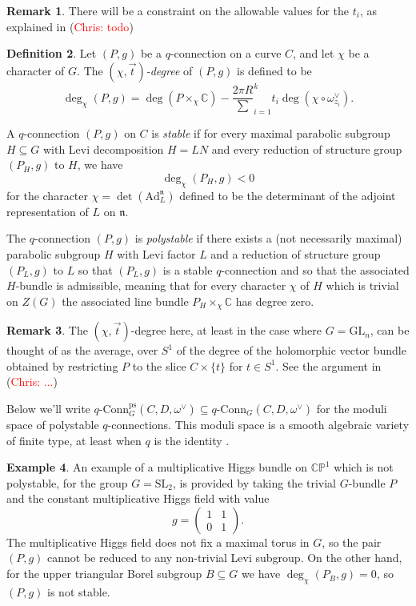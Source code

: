 \documentclass[11pt, oneside, reqno]{amsart}
\theoremstyle{definition} \newtheorem{definition}{Definition}[section]
\theoremstyle{definition} \newtheorem{remark}[definition]{Remark}
\theoremstyle{definition} \newtheorem{remarks}[definition]{Remarks}
\theoremstyle{definition} \newtheorem{question}[definition]{Question}
\theoremstyle{definition} \newtheorem*{note}{Note}
\theoremstyle{definition} \newtheorem{example}[definition]{Example}
\theoremstyle{definition} \newtheorem{examples}[definition]{Examples}
\newcommand{\bb}[1]{\mathbb{#1}}
\newcommand{\mr}[1]{\mathrm{#1}}
\newcommand{\mf}[1]{\mathfrak{#1}}
\newcommand{\CC}{\mathbb{C}}
\newcommand{\SL}{\mathrm{SL}}
\newcommand{\GL}{\mathrm{GL}}
\newcommand{\sub}{\subseteq}
\newcommand{\qconn}{q\text{-Conn}}
\newcommand{\chris}[1]{(\textcolor{red}{Chris: #1})}
\begin{document}
\begin{remark} \label{t_stability_remark}
There will be a constraint on the allowable values for the $t_i$, as explained in \chris{todo}
\end{remark}

\begin{definition} \label{polystable_def}
Let $(P,g)$ be a $q$-connection on a curve $C$, and let $\chi$ be a character of $G$.  The \emph{$(\chi, \overrightarrow{t})$-degree} of $(P,g)$ is defined to be 
\[\deg_\chi(P,g) = \deg(P \times_\chi \CC) - \frac {2\pi R} \sum_{i=1}^k t_i\deg(\chi \circ \omega^\vee_{z_i}).\]

A $q$-connection $(P,g)$ on $C$ is \emph{stable} if for every maximal parabolic subgroup $H \sub G$ with Levi decomposition $H = LN$ and every reduction of structure group $(P_H, g)$ to $H$, we have
\[\deg_\chi(P_H, g) < 0\]
for the character $\chi = \det(\mr{Ad}_L^{\mf n})$ defined to be the determinant of the adjoint representation of $L$ on $\mf n$.

The $q$-connection $(P,g)$ is \emph{polystable} if there exists a (not necessarily maximal) parabolic subgroup $H$ with Levi factor $L$ and a reduction of structure group $(P_L, g)$ to $L$ so that $(P_L,g)$ is a stable $q$-connection and so that the associated $H$-bundle is admissible, meaning that for every character $\chi$ of $H$ which is trivial on $Z(G)$ the associated line bundle $P_H \times_\chi \CC$ has degree zero. 
\end{definition}

\begin{remark}
The $(\chi, \overrightarrow{t})$-degree here, at least in the case where $G = \GL_n$, can be thought of as the average, over $S^1$ of the degree of the holomorphic vector bundle obtained by restricting $P$ to the slice $C \times \{t\}$ for $t \in S^1$.  See the argument in \chris{...}
\end{remark}

Below we'll write $\qconn_G^{\text{ps}}(C, D, \omega^\vee) \sub \qconn_G(C,D,\omega^\vee)$ for the moduli space of polystable $q$-connections.  This moduli space is a smooth algebraic variety of finite type, at least when $q$ is the identity \cite{CharbonneauHurtubise,Smith}.  

\begin{example}
An example of a multiplicative Higgs bundle on $\bb{CP}^1$ which is not polystable, for the group $G = \SL_2$, is provided by taking the trivial $G$-bundle $P$ and the constant multiplicative Higgs field with value \[g = \begin{pmatrix}1&1\\0&1\end{pmatrix}.\]  The multiplicative Higgs field does not fix a maximal torus in $G$, so the pair $(P,g)$ cannot be reduced to any non-trivial Levi subgroup.  On the other hand, for the upper triangular Borel subgroup $B \sub G$ we have $\deg_\chi(P_B, g) = 0$, so $(P,g)$ is not stable.
\end{example}
\end{document}
